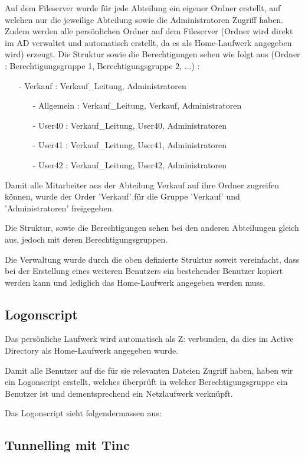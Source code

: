 \documentclass[11pt,a4paper,parskip=half]{scrartcl}
\begin{document}
Auf dem Fileserver wurde für jede Abteilung ein eigener Ordner erstellt, auf welchen nur die jeweilige Abteilung sowie die Administratoren Zugriff haben. Zudem werden alle persönlichen Ordner auf dem Fileserver (Ordner wird direkt im AD verwaltet und automatisch erstellt, da es als Home-Laufwerk angegeben wird) erzeugt. Die Struktur sowie die Berechtigungen sehen wie folgt aus (Ordner : Berechtigungsgruppe 1, Berechtigungsgruppe 2, ...) :
\begin{itemize}
\item[-]{Verkauf : Verkauf\_Leitung, Administratoren}
\begin{itemize}
\item[-]{Allgemein : Verkauf\_Leitung, Verkauf, Administratoren}
\item[-]{User40 : Verkauf\_Leitung, User40, Administratoren}
\item[-]{User41 : Verkauf\_Leitung, User41, Administratoren}
\item[-]{User42 : Verkauf\_Leitung, User42, Administratoren}
\end{itemize}
\end{itemize}
Damit alle Mitarbeiter aus der Abteilung Verkauf auf ihre Ordner zugreifen können, wurde der Order 'Verkauf' für die Gruppe 'Verkauf' und 'Administratoren' freigegeben.

Die Struktur, sowie die Berechtigungen sehen bei den anderen Abteilungen gleich aus, jedoch mit deren Berechtigungsgruppen.

Die Verwaltung wurde durch die oben definierte Struktur soweit vereinfacht, dass bei der Erstellung eines weiteren Benutzers ein bestehender Benutzer kopiert werden kann und lediglich das Home-Laufwerk angegeben werden muss.
\subsection{Logonscript}
Das persönliche Laufwerk wird automatisch als Z: verbunden, da dies im Active Directory als Home-Laufwerk angegeben wurde.

Damit alle Benutzer auf die für sie relevanten Dateien Zugriff haben, haben wir ein Logonscript erstellt, welches überprüft in welcher Berechtigungsgruppe ein Benutzer ist und dementsprechend ein Netzlaufwerk verknüpft.

Das Logonscript sieht folgendermassen aus:


\subsection{Tunnelling mit Tinc}

\end{document}
